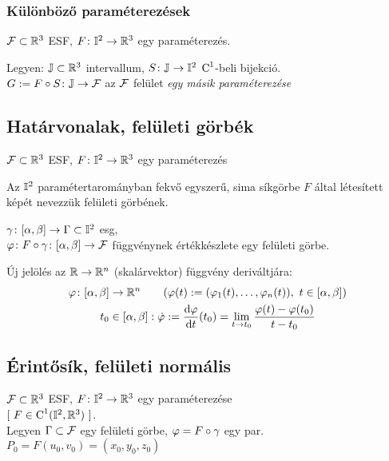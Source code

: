 \subsubsection{Különböző paraméterezések}
$\mathcal F\subset\mathbb{R}^3$ ESF, $F\colon \mathbb I^2\to\mathbb{R}^3$ egy paraméterezés.

\noindent Legyen: $\mathbb J\subset \mathbb{R}^3$ intervallum, $S\colon\mathbb J\to\mathbb I^2$ $\operatorname{C}^1$-beli bijekció.\\
$G := F\circ S\colon \mathbb J\to\mathcal F$ az $\mathcal F$ felület \emph{egy másik paraméterezése}

\subsection{Határvonalak, felületi görbék}
$\mathcal F\subset\mathbb{R}^3$ ESF,  $F\colon \mathbb I^2\to\mathbb{R}^3$ egy paraméterezés

\begin{de}%
Az $\mathbb I^2$ paramétertarományban fekvő egyszerű, sima síkgörbe $F$ által létesített képét nevezzük
felületi görbének.
\end{de}

\noindent$\gamma\colon[\alpha,\beta]\to\Gamma\subset \mathbb I^2$ esg,\\
$\varphi\colon F\circ \gamma\colon [\alpha,\beta]\to\mathcal F$ függvénynek értékkészlete egy felületi görbe.


\begin{megj}
  Új jelölés az $\mathbb{R}\to\mathbb{R}^n$ (skalárvektor) függvény deriváltjára:
  \begin{gather*}
    \vfi\colon[\alpha,\beta]\to\R^n\qquad (\vfi(t) := (\vfi_1(t),\dotsc,\vfi_n(t)),\ t\in[\alpha,\beta])\\
    t_0\in[\alpha,\beta]: \Dot{\vfi} := \dfrac{\diff \vfi}{\diff t}(t_0) = \lim_{t\to t_0}\dfrac{\vfi(t)-\vfi(t_0)}{t-t_0}
  \end{gather*}
\end{megj}


\subsection{Érintősík, felületi normális}
\begin{de}%
  $\mathcal F\subset\mathbb{R}^3$ ESF, $F\colon \mathbb I^2\to\mathbb{R}^3$ egy paraméterezése\\ $[\ F \in\operatorname{C}^1(\mathbb I^2,\mathbb{R}^3)\ ]$.\\
  Legyen $\Gamma\subset\mathcal F$ egy felületi görbe, $\varphi = F \circ \gamma$ egy par.  \\
  $P_0 = F(u_0,v_0) = (x_0,y_0,z_0)$
\end{de}

